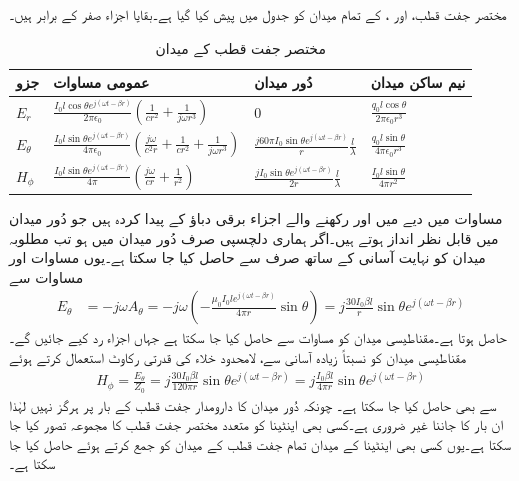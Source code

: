 مختصر جفت قطب،  اور ، کے تمام میدان کو جدول  میں پیش کیا گیا ہے۔بقایا اجزاء  صفر  کے برابر ہیں۔
\begin{table}
\caption{مختصر جفت قطب کے میدان}
\centering
\begin{tabular}{l l l l}
\hline
جزو & عمومی مساوات & دُور میدان & نیم ساکن میدان\\
\hline 
\rule{0pt}{2em}
$E_r$ &$\frac{I_0 l \cos \theta e^{j(\omega t -\beta r)}}{2\pi \epsilon_0}\left(\frac{1}{c r^2}+\frac{1}{j \omega r^3} \right)$&$0$&$\frac{q_0 l \cos \theta}{2\pi \epsilon_0 r^3}$ \\[4ex]
$E_{\theta}$&$\frac{I_0 l \sin \theta e^{j(\omega t -\beta r)}}{4\pi \epsilon_0}\left(\frac{j \omega}{c^2 r}+\frac{1}{c r^2}+\frac{1}{j \omega r^3} \right)$&$ \frac{j 60 \pi I_0 \sin \theta e^{j(\omega t-\beta r)}}{r} \frac{l}{\lambda}$& $\frac{q_0 l \sin \theta }{4\pi \epsilon_0 r^3}$\\ [4ex]
$H_{\phi}$&$\frac{I_0 l \sin \theta e^{j(\omega t -\beta r)}}{4\pi} \left(\frac{j \omega}{c r}+\frac{1}{r^2} \right)$&$\frac{j I_0 \sin \theta e^{j(\omega t -\beta r)}}{2r}\frac{l}{\lambda}  $& $\frac{I_0 l \sin \theta }{4\pi r^2} $
\end{tabular}
\label{جدول_اینٹینا_مختصر_جفت_قطب}
\end{table}


مساوات  میں دیے   میں  اور  رکھنے والے اجزاء برقی دباؤ  کے پیدا کردہ ہیں جو دُور میدان میں قابل نظر انداز ہوتے ہیں۔اگر ہماری دلچسپی صرف دُور میدان میں ہو تب مطلوبہ میدان کو نہایت آسانی کے ساتھ صرف  سے حاصل کیا جا سکتا ہے۔یوں مساوات  اور مساوات  سے
\begin{align}\label{مساوات_اینٹینا_دور_میدان_برقی_رو_سے_حصول}
E_{\theta}&=-j \omega A_{\theta}=-j \omega \left(-\frac{ \mu_0 I_0 l e^{j(\omega t -\beta r)}}{4\pi r} \sin \theta \right)=j \frac{30 I_0 \beta l}{r} \sin \theta e^{j(\omega t-\beta r)}
\end{align}
حاصل ہوتا ہے۔مقناطیسی میدان  کو مساوات  سے حاصل کیا جا سکتا ہے  جہاں  اجزاء رد کیے جائیں گے۔مقناطیسی میدان  کو نسبتاً زیادہ آسانی سے، لامحدود خلاء کی قدرتی رکاوٹ  استعمال کرتے ہوئے
\begin{align}
H_{\phi}=\frac{E_{\theta}}{Z_0}=j \frac{30 I_0 \beta l}{120 \pi r} \sin \theta e^{j(\omega t-\beta r)}=j \frac{ I_0 \beta l}{4 \pi r} \sin \theta e^{j(\omega t-\beta r)}
\end{align}
سے بھی  حاصل کیا جا سکتا ہے۔ چونکہ دُور میدان کا دارومدار جفت قطب کے بار  پر ہرگز نہیں لہٰذا ان بار کا جاننا غیر ضروری ہے۔کسی بھی اینٹینا کو متعدد مختصر جفت قطب کا مجموعہ تصور کیا جا سکتا ہے۔یوں کسی بھی اینٹینا کے میدان تمام جفت قطب کے میدان کو جمع کرتے ہوئے حاصل کیا جا سکتا ہے۔   

